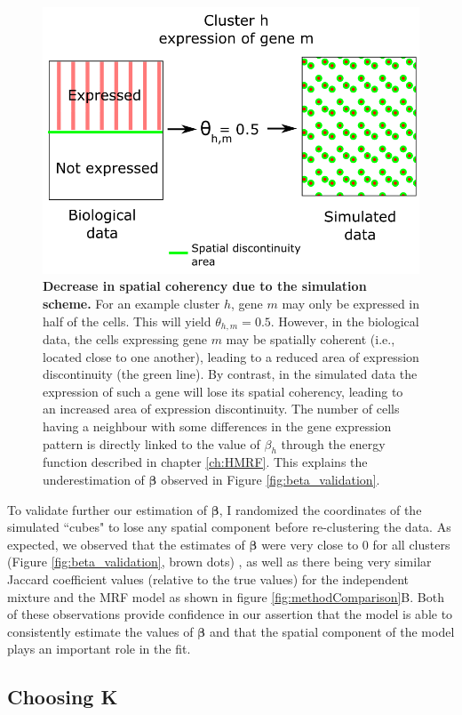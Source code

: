 	\begin{figure}[H]
\centerline{\includegraphics[width=0.6\linewidth]{gfx/chapter5/beta_error.png}}
\caption{{\bf Decrease in spatial coherency due to the simulation scheme.} For an example cluster $h$, gene $m$ may only be expressed in half of the cells. This will yield $\theta_{h,m} = 0.5$. However, in the biological data, the cells expressing gene $m$ may be spatially coherent (i.e., located close to one another), leading to a reduced area of expression discontinuity (the green line). By contrast, in the simulated data the expression of such a gene will lose its spatial coherency, leading to an increased area of expression discontinuity. The number of cells having a neighbour with some differences in the gene expression pattern is directly linked to the value of $\beta_h$ through the energy function described in chapter \ref{ch:HMRF}. This explains the underestimation of $\boldsymbol{\beta}$ observed in Figure \ref{fig:beta_validation}.}
\label{fig:beta_error}
	\end{figure}

To validate further our estimation of $\boldsymbol{\beta}$, I randomized the coordinates of the simulated ``cubes" to lose any spatial component before re-clustering the data. As expected, we observed that the estimates of $\boldsymbol{\beta}$ were very close to $0$ for all clusters (Figure \ref{fig:beta_validation}, brown dots) , as well as there being very similar Jaccard coefficient values (relative to the true values) for the independent mixture and the MRF model as shown in figure \ref{fig:methodComparison}B. Both of these observations provide confidence in our assertion that the model is able to consistently estimate the values of $\boldsymbol{\beta}$ and that the spatial component of the model plays an important role in the fit.\\
	
	\subsection{Choosing K}
	
